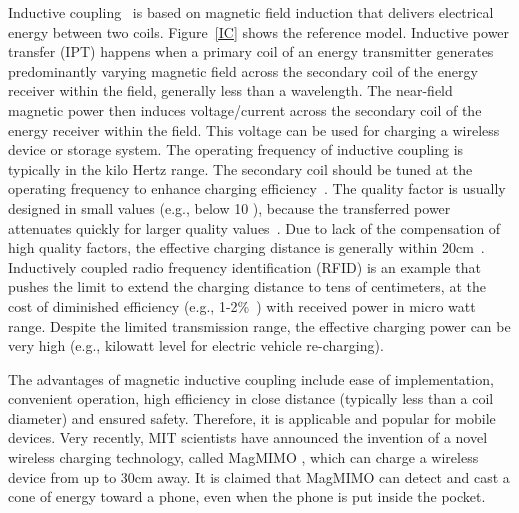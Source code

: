 \documentclass[twocolumn,10pt]{IEEEtran}
\begin{document}
Inductive coupling~\cite{WPC} is based on magnetic field induction that delivers electrical energy between two coils. Figure~\ref{IC} shows the reference model. 
Inductive power transfer (IPT) happens when a primary coil of an energy transmitter generates predominantly varying magnetic field across the secondary coil of the energy receiver within the field, generally less than a wavelength. The near-field magnetic power then induces voltage/current across the secondary coil of the energy receiver within the field. This voltage can be used for charging a wireless device or storage system.  
The operating frequency of inductive coupling is typically in the kilo Hertz range. The secondary coil should be tuned at the operating frequency to enhance charging efficiency~\cite{X.2014Wei}. The quality factor is usually designed in small values (e.g., below 10 \cite{S.2004Wang}), because the transferred power attenuates quickly for larger quality values~\cite{Z.2012Pantic}. Due to lack of the compensation of high quality factors, the effective charging distance is generally within 20cm~\cite{X.2014Wei}. Inductively coupled radio frequency identification (RFID) \cite{S.2008Ahson,L.2013Roselli} is an example that pushes the limit to extend the charging distance to tens of centimeters, at the cost of diminished efficiency (e.g., 1-2$\%$~\cite{A.2008Sample}) with received power in micro watt range. Despite the limited transmission range, the effective charging power can be very high (e.g., kilowatt level \cite{H2012Wu} for electric vehicle re-charging).

The advantages of magnetic inductive coupling include ease of implementation, convenient operation, high efficiency in close distance (typically less than a coil diameter) and ensured safety. Therefore, it is applicable and popular for mobile devices.
Very recently, MIT scientists have announced the invention of a novel wireless charging technology, called MagMIMO \cite{J.2014Jadidian}, which can charge a wireless device from up to 30cm away. It is claimed that MagMIMO can detect and cast a cone of energy toward a phone, even when the phone is put inside the pocket.   
\end{document}
